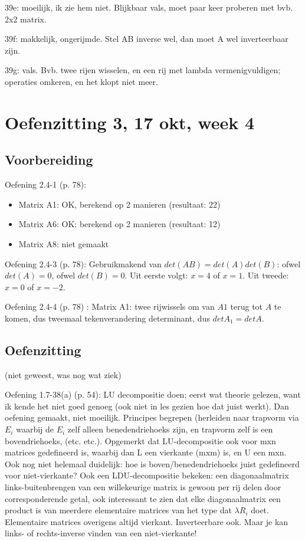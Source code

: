 \documentclass{article}
\begin{document}
39e: moeilijk, ik zie hem niet. Blijkbaar vals, moet paar keer proberen met bvb. 2x2 matrix. 

39f: makkelijk, ongerijmde. Stel AB inverse wel, dan moet A wel inverteerbaar zijn. 

39g: vals. Bvb. twee rijen wisselen, en een rij met  lambda vermenigvuldigen; operaties omkeren, en het klopt niet meer. 



\section{Oefenzitting 3, 17 okt, week 4}

\subsection {Voorbereiding}


Oefening 2.4-1 (p. 78):  
\begin{itemize}
\item Matrix A1: OK, berekend op 2 manieren (resultaat: 22) 
\item Matrix A6: OK: berekend op 2 manieren (resultaat: 12) 
\item Matrix A8: niet gemaakt 
\end{itemize}

Oefening 2.4-3 (p. 78):   
Gebruikmakend van $det(AB)=det(A)det(B)$: ofwel $det(A)=0$, ofwel $det(B)=0$. Uit eerste volgt: $x=4$ of $x=1$. Uit tweede: $x=0$ of $x=-2$. 

Oefening 2.4-4 (p. 78) : 
Matrix A1: twee rijwissels om van $A1$ terug tot $A$ te komen, dus tweemaal tekenverandering determinant, dus $detA_1=detA$. 


\subsection{Oefenzitting}

(niet geweest, was nog wat ziek) 

Oefening 1.7-38(a) (p. 54): LU decompositie doen; eerst wat theorie gelezen, want ik kende het niet goed genoeg (ook niet in les gezien hoe dat juist werkt). Dan oefening gemaakt, niet moeilijk. Principes begrepen (herleiden naar trapvorm via $E_i$ waarbij de $E_i$ zelf alleen benedendriehoeks zijn, en trapvorm zelf is een bovendriehoeks, (etc. etc.). Opgemerkt dat LU-decompositie ook voor mxn matrices gedefineerd is, waarbij dan L een vierkante (mxm) is, en U een mxn. Ook nog niet helemaal duidelijk: hoe is boven/benedendriehoeks juist gedefineerd voor niet-vierkante? Ook een LDU-decompositie bekeken: een diagonaalmatrix links-buitenbrengen van een willekeurige matrix is gewoon per rij delen door corresponderende getal, ook interessant te zien dat elke diagonaalmatrix een product is van meerdere elementaire matrices van het type dat $\lambda R_i$ doet. Elementaire matrices overigens altijd vierkant. Inverteerbare ook. Maar je kan links- of rechts-inverse vinden van een niet-vierkante! 
\end{document}
